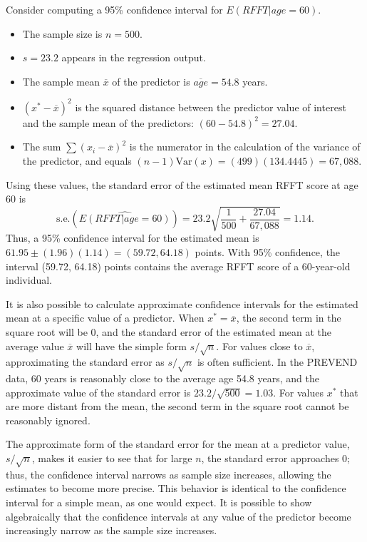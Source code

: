Consider computing a 95\% confidence interval for $E(RFFT|age = 60)$.
\begin{itemize}
  \item  The sample size is $n = 500$.

  \item $s = 23.2$ appears in the regression output.

  \item The sample mean $\overline{x}$ of the predictor is $\overline{age} = 54.8$ years.

  \item $(x^* - \overline{x})^2 $ is the squared distance between the predictor value of interest and the sample mean of the predictors: $(60 - 54.8)^2 = 27.04$.

  \item The sum $\sum(x_i-\overline{x})^2$ is the numerator in the calculation of the variance of the predictor, and equals $(n - 1)\text{Var}(x) = (499)(134.4445) = 67,088$. 
   \end{itemize}

Using these values, the standard error of the estimated mean RFFT score at age 60 is
\[\text{s.e.}(\widehat{E(RFFT|age = 60)}) = 23.2 \sqrt{\frac{1}{500} + \frac{27.04}{67,088}} = 1.14.\]
Thus, a 95\% confidence interval for the estimated mean is $61.95 \pm (1.96)(1.14) = (59.72, 64.18)$ points. With 95\% confidence, the interval (59.72, 64.18) points contains the average RFFT score of a 60-year-old individual.

It is also possible to calculate approximate confidence intervals for the estimated mean at a specific value of a predictor. When $x^* = \overline{x}$, the second term in the square root will be 0, and the standard error of the estimated mean at the average value $\overline{x}$ will have the simple form $s/\sqrt{n}$. For values close to $\overline{x}$, approximating the standard error as $s/\sqrt{n}$ is often sufficient.  In the PREVEND data, 60 years is reasonably close to the average age 54.8 years, and the approximate value of the standard error is $23.2/\sqrt{500} = 1.03$.  For values $x^*$ that are more distant from the mean, the second term in the square root cannot be reasonably ignored.

The approximate form of the standard error for the mean at a predictor value, $s/\sqrt{n}$, makes it easier to see that for large $n$, the standard error approaches 0; thus, the confidence interval narrows as sample size increases, allowing the estimates to become more precise. This behavior is identical to the confidence interval for a simple mean, as one would expect.  It is possible to show algebraically that the confidence intervals at any value of the predictor become increasingly narrow as the sample size increases.


